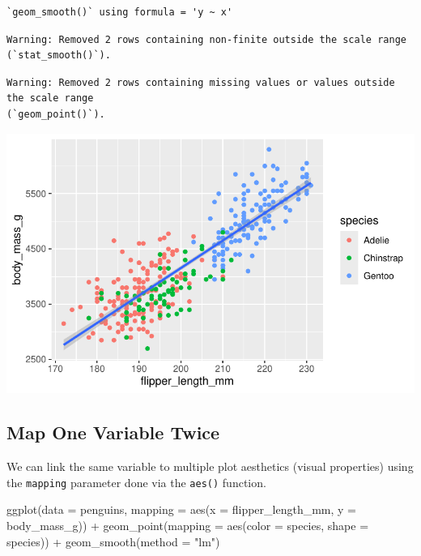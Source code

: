\documentclass[
  letterpaper,
  DIV=11,
  numbers=noendperiod]{scrreprt}
\newenvironment{Shaded}{\begin{snugshade}}{\end{snugshade}}
\newcommand{\AttributeTok}[1]{\textcolor[rgb]{0.40,0.45,0.13}{#1}}
\newcommand{\FunctionTok}[1]{\textcolor[rgb]{0.28,0.35,0.67}{#1}}
\newcommand{\NormalTok}[1]{\textcolor[rgb]{0.00,0.23,0.31}{#1}}
\newcommand{\SpecialCharTok}[1]{\textcolor[rgb]{0.37,0.37,0.37}{#1}}
\newcommand{\StringTok}[1]{\textcolor[rgb]{0.13,0.47,0.30}{#1}}
\begin{document}
\begin{verbatim}
`geom_smooth()` using formula = 'y ~ x'
\end{verbatim}

\begin{verbatim}
Warning: Removed 2 rows containing non-finite outside the scale range
(`stat_smooth()`).
\end{verbatim}

\begin{verbatim}
Warning: Removed 2 rows containing missing values or values outside the scale range
(`geom_point()`).
\end{verbatim}

\includegraphics{src/r-for-data-science/01-data-viz_files/figure-pdf/unnamed-chunk-12-1.pdf}

\subsection{Map One Variable Twice}\label{map-one-variable-twice}

We can link the same variable to multiple plot aesthetics (visual
properties) using the \texttt{mapping} parameter done via the
\texttt{aes()} function.

\begin{Shaded}
\begin{Highlighting}[]
\FunctionTok{ggplot}\NormalTok{(}\AttributeTok{data =}\NormalTok{ penguins,}
       \AttributeTok{mapping =} \FunctionTok{aes}\NormalTok{(}\AttributeTok{x =}\NormalTok{ flipper\_length\_mm, }\AttributeTok{y =}\NormalTok{ body\_mass\_g)) }\SpecialCharTok{+}
  \FunctionTok{geom\_point}\NormalTok{(}\AttributeTok{mapping =} \FunctionTok{aes}\NormalTok{(}\AttributeTok{color =}\NormalTok{ species, }\AttributeTok{shape =}\NormalTok{ species)) }\SpecialCharTok{+}
  \FunctionTok{geom\_smooth}\NormalTok{(}\AttributeTok{method =} \StringTok{"lm"}\NormalTok{)}
\end{Highlighting}
\end{Shaded}
\end{document}
